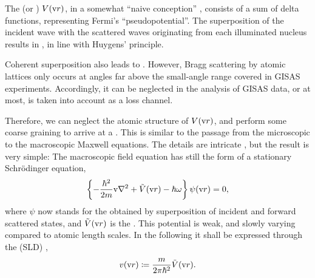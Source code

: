 %
%
%
%
The  (or )
 $V(\text{v}{r})$,
in a somewhat ``naive conception'' \cite[p.~7]{Sea89},
consists of a sum of delta functions,
representing Fermi's ``pseudopotential''.
%
The superposition of the incident wave with the scattered waves
originating from each illuminated nucleus
results in ,
%
in line with Huygens' principle.
%

Coherent superposition also leads to .
%
However, Bragg scattering by atomic lattices only occurs at angles
far above the small-angle range covered in GISAS experiments.
Accordingly, it can be neglected in the analysis of GISAS data,
or at most, is taken into account as a loss channel.

Therefore,
we can neglect the atomic structure of $V(\text{v}{r})$,
and perform some coarse graining to
arrive at a .
%
This is
similar to the passage from
the microscopic to the macroscopic Maxwell equations.
The details are intricate \cite{Sea89,Lax51},
but the result \cite[eq.~2.8.32]{Sea89} is very simple:
The macroscopic field equation
has still the form of a stationary Schrödinger equation,
%
\begin{equation}\label{EmacrSchrodi}
  \left\{-\frac{\hbar^2}{2m}\text{v}{\nabla}^2+\tilde{V}(\text{v}{r})-\hbar\omega\right\} \psi(\text{v}{r}) = 0,
\end{equation}
%
%
where $\psi$ now stands for the 
%
%
obtained by superposition of
incident and forward scattered states,
and $\tilde{V}(\text{v}{r})$ is the .
%
This potential is weak, and slowly varying compared to atomic length scales.
In the following it shall be expressed through the
 (SLD)
%
%
%
\cite[eq.\ 2.8.37]{Sea89},
%
\begin{equation}
  v(\text{v}{r})\coloneqq\frac{m}{2\pi \hbar^2}\tilde{V}(\text{v}{r}).
\end{equation}

